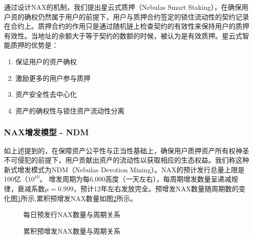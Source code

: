 通过设计NAX的机制，我们提出星云式质押（Nebulas Smart Staking），在确保用户资的确权仍然属于用户的前提下，用户与质押合约签定的锁住流动性的契约记录在合约上。质押合约的作用只是通过随机链上检查契约的有效性来保持用户的质押有效性。当地址的余额大于等于契约的数额的时候，被认为是有效质押。星云式智能质押的优势是：
\begin{enumerate}[\hspace{2cm}(a)]
    \item 保证用户的资产确权
    \item 激励更多的用户参与质押
    \item 资产安全性去中心化
    \item 资产的确权性与锁住资产流动性分离
\end{enumerate}

\subsubsection{NAX增发模型 - NDM}
如上述提到的，在保障资产公平性与正当性基础上，确保用户质押资产所有权神圣不可侵犯的前提下，用户贡献出资产的流动性以获取相应的生态权益。我们称这种新式增发模式为NDM（Nebulas Devotion Mining）。NAX的预计发行总量上限是100亿（\(10^{10}\)。 增发周期为每6,000高度（一天左右），每周期增发数量呈递减规律，衰减系数$\mu=0.999$，预计12年左右发放完全。预增发NAX数量随周期数的变化图\ref{dist}所示,累积预增发NAX数量如图\ref{acc}所示。

\begin{figure}
\centering
    \caption{每日预发行NAX数量与周期关系}\label{dist}
\end{figure}


\begin{figure}
\centering
\caption{累积预增发NAX数量与周期关系}\label{acc}
\end{figure}


